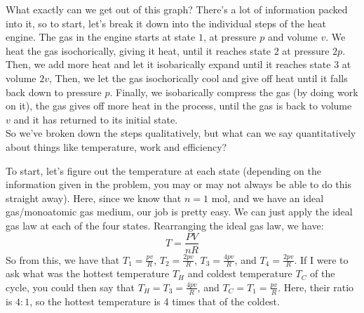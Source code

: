 \begin{center}
\end{center}

What exactly can we get out of this graph? There's a lot of information packed into it, so to start, let's break it down into the individual steps of the heat engine. The gas in the engine starts at state $1$, at pressure $p$ and volume $v$. We heat the gas isochorically, giving it heat, until it reaches state $2$ at pressure $2p$. Then, we add more heat and let it isobarically expand until it reaches state $3$ at volume $2v$, Then, we let the gas isochorically cool and give off heat until it falls back down to pressure $p$. Finally, we isobarically compress the gas (by doing work on it), the gas gives off more heat in the process, until the gas is back to volume $v$ and it has returned to its initial state. \\
So we've broken down the steps qualitatively, but what can we say quantitatively about things like temperature, work and efficiency? 

To start, let's figure out the temperature at each state (depending on the information given in the problem, you may or may not always be able to do this straight away). Here, since we know that $n=1\text{ mol}$, and we have an ideal gas/monoatomic gas medium, our job is pretty easy. We can just apply the ideal gas law at each of the four states. Rearranging the ideal gas law, we have:
\[ T = \frac{PV}{nR} \]
So from this, we have that $T_1 = \frac{pv}{R}$, $T_2 = \frac{2pv}{R}$, $T_3 = \frac{4pv}{R}$, and $T_4 = \frac{2pv}{R}$. If I were to ask what was the hottest temperature $T_H$ and coldest temperature $T_C$ of the cycle, you could then say that $T_H = T_3 = \frac{4pv}{R}$, and $T_C = T_1 = \frac{pv}{R}$. Here, their ratio is $4:1$, so the hottest temperature is 4 times that of the coldest. \\

